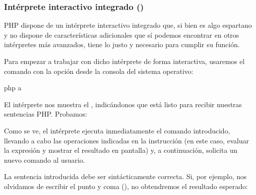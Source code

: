 \documentclass[a4paper,12pt,spanish]{sphinxmanual}
\begin{document}
\subsubsection{Intérprete interactivo integrado ()}
\label{\detokenize{php:interprete-interactivo-integrado-php-a}}
PHP dispone de un intérprete interactivo integrado que, si bien es algo
espartano y no dispone de características adicionales que sí podemos encontrar
en otros intérpretes más avanzados, tiene lo justo y necesario para cumplir su
función.

Para empezar a trabajar con dicho intérprete de forma interactiva, usaremos el
comando  con la opción  desde la consola del sistema operativo:

\begin{sphinxVerbatim}[commandchars=\\\{\}]
 php \PYGZhy{}a

\end{sphinxVerbatim}

El intérprete nos muestra el  , indicándonos que está listo
para recibir nuestras sentencias PHP. Probamos:

\begin{sphinxVerbatim}[commandchars=\\\{\}]
\end{sphinxVerbatim}

Como se ve, el intérprete ejecuta inmediatamente el comando introducido,
llevando a cabo las operaciones indicadas en la instrucción (en este caso,
evaluar la expresión y mostrar el resultado en pantalla) y, a continuación,
solicita un nuevo comando al usuario.

La sentencia introducida debe ser sintácticamente correcta. Si, por ejemplo, nos
olvidamos de escribir el punto y coma (\sphinxcode{;}), no obtendremos el resultado
esperado:

\begin{sphinxVerbatim}[commandchars=\\\{\}]


\end{sphinxVerbatim}
\end{document}
